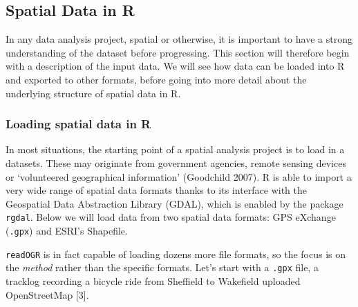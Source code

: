 \documentclass[]{article}
\begin{document}
\subsection{Spatial Data in R}

In any data analysis project, spatial or otherwise, it is important to
have a strong understanding of the dataset before progressing. This
section will therefore begin with a description of the input data. We
will see how data can be loaded into R and exported to other formats,
before going into more detail about the underlying structure of spatial
data in R.

\subsubsection{Loading spatial data in R}

In most situations, the starting point of a spatial analysis project is
to load in a datasets. These may originate from government agencies,
remote sensing devices or `volunteered geographical information'
(Goodchild 2007). R is able to import a very wide range of spatial data
formats thanks to its interface with the Geospatial Data Abstraction
Library (GDAL), which is enabled by the package \texttt{rgdal}. Below we
will load data from two spatial data formats: GPS eXchange
(\texttt{.gpx}) and ESRI's Shapefile.

\texttt{readOGR} is in fact capable of loading dozens more file formats,
so the focus is on the \emph{method} rather than the specific formats.
Let's start with a \texttt{.gpx} file, a tracklog recording a bicycle
ride from Sheffield to Wakefield uploaded OpenStreetMap {[}3{]}.
\end{document}
